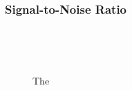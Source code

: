 \documentclass[
  a4paper,
]{scrbook}
\begin{document}
\hypertarget{signal-to-noise-ratio}{%
\subsubsection*{Signal-to-Noise Ratio}\label{signal-to-noise-ratio}}

\begin{figure}

\begin{minipage}[t]{0.25\linewidth}

{\centering 

~

}

\end{minipage}%
%
\begin{minipage}[t]{0.50\linewidth}

{\centering 


}

\subcaption{\label{fig-salt-conc-SNR}}
\end{minipage}%
%
\begin{minipage}[t]{0.25\linewidth}

{\centering 

~

}

\end{minipage}%

\caption{\label{fig-salt-conc-SNR}The}

\end{figure}

\appendix
{}
\end{document}
